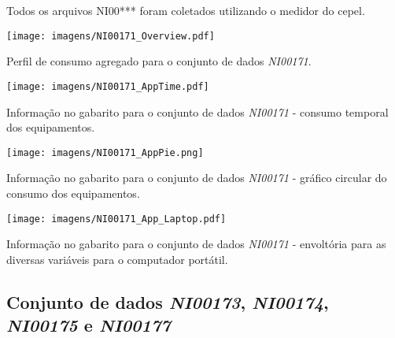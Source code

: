 Todos os arquivos NI00*** foram coletados utilizando o medidor do
\acs{cepel}.

\begin{SidewaysFigure}
\centering
\texttt{[image: imagens/NI00171\_Overview.pdf]}
\caption{Perfil de consumo agregado para o conjunto de dados
\emph{NI00171}.}
\label{fig:ni00171_overview}
\end{SidewaysFigure}

\begin{SidewaysFigure}
\centering
\texttt{[image: imagens/NI00171\_AppTime.pdf]}
\caption{Informação no gabarito para o conjunto de dados
\emph{NI00171} - consumo temporal dos equipamentos.}
\label{fig:ni00171_app_time}
\end{SidewaysFigure}

\begin{SidewaysFigure}
\centering
\texttt{[image: imagens/NI00171\_AppPie.png]}
\caption{Informação no gabarito para o conjunto de dados
\emph{NI00171} - gráfico circular do consumo dos equipamentos.}
\label{fig:ni00171_app_pie}
\end{SidewaysFigure}

\begin{SidewaysFigure}
\centering
\texttt{[image: imagens/NI00171\_App\_Laptop.pdf]}
\caption{Informação no gabarito para o conjunto de dados
\emph{NI00171} - envoltória para as diversas variáveis para o
computador portátil.}
\label{fig:ni00171_laptop}
\end{SidewaysFigure}


\FloatBarrier
\subsection{Conjunto de dados \emph{NI00173}, \emph{NI00174},
\emph{NI00175} e \emph{NI00177}}

